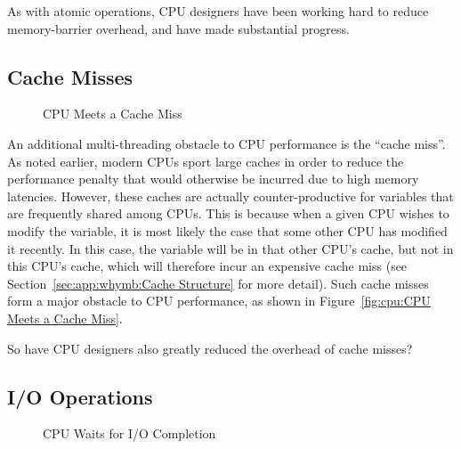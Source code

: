 As with atomic operations, CPU designers have been working hard to
reduce memory-barrier overhead, and have made substantial progress.

\subsection{Cache Misses}
\label{sec:cpu:Cache Misses}

\begin{figure}[tb]
\centering
{}
\caption{CPU Meets a Cache Miss}
\end{figure}

An additional multi-threading obstacle to CPU performance is
the ``cache miss''.
As noted earlier, modern CPUs sport large caches in order to reduce the
performance penalty that would otherwise be incurred due to high memory
latencies.
However, these caches are actually counter-productive for variables that
are frequently shared among CPUs.
This is because when a given CPU wishes to modify the variable, it is
most likely the case that some other CPU has modified it recently.
In this case, the variable will be in that other CPU's cache, but not
in this CPU's cache, which will therefore incur an expensive cache miss
(see Section~\ref{sec:app:whymb:Cache Structure} for more detail).
Such cache misses form a major obstacle to CPU performance, as shown
in Figure~\ref{fig:cpu:CPU Meets a Cache Miss}.

\QuickQuiz{}
	So have CPU designers also greatly reduced the overhead of
	cache misses?
 \QuickQuizEnd

\subsection{I/O Operations}
\label{sec:cpu:I/O Operations}

\begin{figure}[tb]
\centering
{}
\caption{CPU Waits for I/O Completion}
\end{figure}

